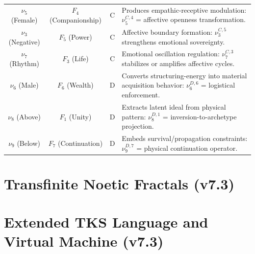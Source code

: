 \documentclass[11pt,twoside,openright]{book}
\theoremstyle{definition}
\theoremstyle{plain}
\theoremstyle{remark}
\begin{document}
\begin{longtable}{c|c|c|p{6.5cm}}
\midrule

$\nu_5$ (Female) & $F_4$ (Companionship) & C
& Produces empathic-receptive modulation:
  $\nu_5^{C,4}$ = affective openness transformation.
\\

$\nu_3$ (Negative) & $F_5$ (Power) & C
& Affective boundary formation:
  $\nu_3^{C,5}$ strengthens emotional sovereignty.
\\

$\nu_7$ (Rhythm) & $F_3$ (Life) & C
& Emotional oscillation regulation:
  $\nu_7^{C,3}$ stabilizes or amplifies affective cycles.
\\

\midrule

$\nu_6$ (Male) & $F_6$ (Wealth) & D
& Converts structuring-energy into material acquisition behavior:
  $\nu_6^{D,6}$ = logistical enforcement.
\\

$\nu_8$ (Above) & $F_1$ (Unity) & D
& Extracts latent ideal from physical pattern:
  $\nu_8^{D,1}$ = inversion-to-archetype projection.
\\

$\nu_9$ (Below) & $F_7$ (Continuation) & D
& Embeds survival/propagation constraints:
  $\nu_9^{D,7}$ = physical continuation operator.
\\

\end{longtable}




\part{Transfinite Noetic Fractals (v7.3)}
\label{part:math-track-v73}


\part{Extended TKS Language and Virtual Machine (v7.3)}
\label{part:compiler-track-v73}

\end{document}
